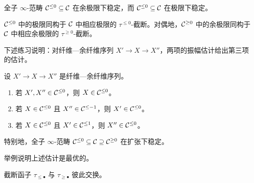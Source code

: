 \begin{exercise}\label{L16-2.5}
全子 $\infty$-范畴 $\mathcal{C}^{\le0}\subseteq\mathcal{C}$ 在余极限下稳定，而 $\mathcal{C}^{\le0}\subseteq\mathcal{C}$ 在极限下稳定。
\end{exercise}


\begin{exercise}\label{L16-2.6}
$\mathcal{C}^{\le0}$ 中的极限同构于 $\mathcal{C}$ 中相应极限的 $\tau^{\le0}$-截断。对偶地，$\mathcal{C}^{\ge0}$ 中的余极限同构于 $\mathcal{C}$ 中相应余极限的 $\tau^{\ge0}$-截断。
\end{exercise}

\nitem\label{L16-2.7} 下述练习说明：对纤维—余纤维序列 $X'\to X\to X''$，两项的振幅估计给出第三项的估计。

\begin{exercise}\label{L16-2.8}
设 $X'\to X\to X''$ 是纤维—余纤维序列。
\begin{enumerate}[label=(\arabic*),leftmargin=2.4em,itemsep=0.1em]
\item 若 $X',X''\in\mathcal{C}^{\le0}$，则 $X\in\mathcal{C}^{\le0}$。
\item 若 $X\in\mathcal{C}^{\le0}$ 且 $X''\in\mathcal{C}^{\le-1}$，则 $X'\in\mathcal{C}^{\le0}$。
\item 若 $X\in\mathcal{C}^{\le0}$ 且 $X'\in\mathcal{C}^{\le1}$，则 $X''\in\mathcal{C}^{\le0}$。
\end{enumerate}
特别地，全子 $\infty$-范畴 $\mathcal{C}^{\le0}\subseteq\mathcal{C}\supseteq\mathcal{C}^{\ge0}$ 在扩张下稳定。
\end{exercise}

\begin{exercise}\label{L16-2.9}
举例说明上述估计是最优的。
\end{exercise}

\begin{exercise}\label{L16-2.10}
截断函子 $\tau_{\le\bullet}$ 与 $\tau_{\ge\bullet}$ 彼此交换。
\end{exercise}

